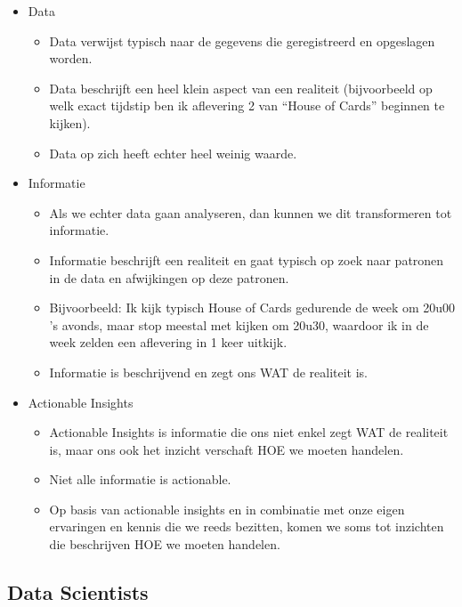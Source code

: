 \documentclass[]{tufte-book}
\providecommand{\tightlist}{%
  \setlength{\itemsep}{0pt}\setlength{\parskip}{0pt}}
\begin{document}
\begin{itemize}
\tightlist
\item
  Data

  \begin{itemize}
  \tightlist
  \item
    Data verwijst typisch naar de gegevens die geregistreerd en opgeslagen worden.
  \item
    Data beschrijft een heel klein aspect van een realiteit (bijvoorbeeld op welk exact tijdstip ben ik aflevering 2 van ``House of Cards'' beginnen te kijken).
  \item
    Data op zich heeft echter heel weinig waarde.
  \end{itemize}
\item
  Informatie

  \begin{itemize}
  \tightlist
  \item
    Als we echter data gaan analyseren, dan kunnen we dit transformeren tot informatie.
  \item
    Informatie beschrijft een realiteit en gaat typisch op zoek naar patronen in de data en afwijkingen op deze patronen.
  \item
    Bijvoorbeeld: Ik kijk typisch House of Cards gedurende de week om 20u00 's avonds, maar stop meestal met kijken om 20u30, waardoor ik in de week zelden een aflevering in 1 keer uitkijk.
  \item
    Informatie is beschrijvend en zegt ons WAT de realiteit is.
  \end{itemize}
\item
  Actionable Insights

  \begin{itemize}
  \tightlist
  \item
    Actionable Insights is informatie die ons niet enkel zegt WAT de realiteit is, maar ons ook het inzicht verschaft HOE we moeten handelen.
  \item
    Niet alle informatie is actionable.
  \item
    Op basis van actionable insights en in combinatie met onze eigen ervaringen en kennis die we reeds bezitten, komen we soms tot inzichten die beschrijven HOE we moeten handelen.
  \end{itemize}
\end{itemize}

\hypertarget{data-scientists}{%
\subsection{Data Scientists}\label{data-scientists}}
\end{document}
